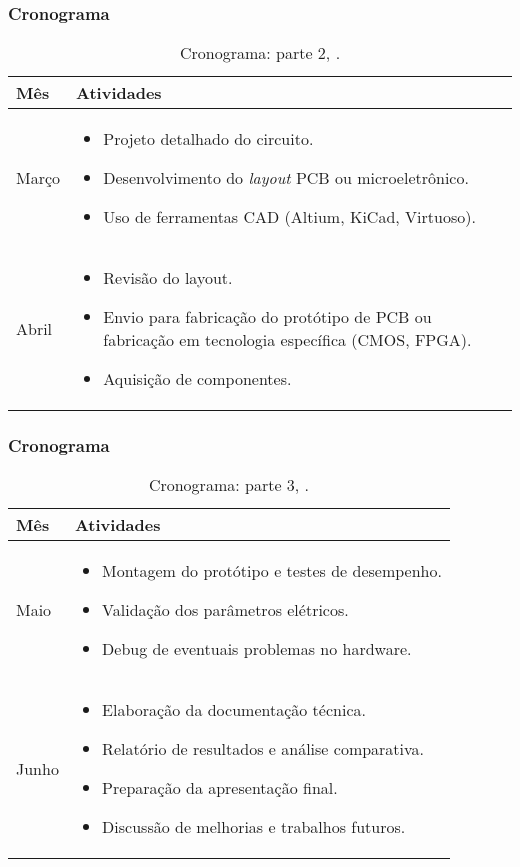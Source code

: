 \documentclass[hyperref={colorlinks=true,    
allcolors = blue,citecolor=blue}]{beamer} %
\begin{document}
\begin{frame}
\frametitle{Cronograma}

\begin{table}[!htp]
\centering
\begin{tabular}{ | m{1.5cm} | m{25em}| } 
  \hline
  Mês & Atividades \\ 
  \hline
  Março & \begin{itemize}
	\item Projeto detalhado do circuito.
	\item Desenvolvimento do \textit{layout} PCB ou microeletrônico.
	\item Uso de ferramentas CAD (Altium, KiCad, Virtuoso).
\end{itemize} \\  \hline
  Abril  & \begin{itemize}
	\item Revisão do layout.
	\item Envio para fabricação do protótipo de PCB ou fabricação em tecnologia específica (CMOS, FPGA).
	\item Aquisição de componentes.
\end{itemize}  \\  \hline  
\end{tabular}
\caption{Cronograma: parte 2, \cite{nome_do_autor}.}
\label{tabela2}
\end{table}

\end{frame}
\begin{frame}
\frametitle{Cronograma}

\begin{table}[!htp]
\centering
\begin{tabular}{ | m{1.5cm} | m{25em}| } 
  \hline
  Mês & Atividades \\ 
  \hline
  Maio & 
\begin{itemize}
	\item Montagem do protótipo e testes de desempenho.	
	\item Validação dos parâmetros elétricos.
	\item Debug de eventuais problemas no hardware.
\end{itemize} \\  \hline
  Junho & \begin{itemize}
	\item Elaboração da documentação técnica.
	\item Relatório de resultados e análise comparativa.
	\item Preparação da apresentação final.
	\item Discussão de melhorias e trabalhos futuros.
\end{itemize}   \\  \hline  
\end{tabular}
\caption{Cronograma: parte 3, \cite{nome_do_autor}.}
\label{tabela2}
\end{table}

\end{frame}
\end{document}

